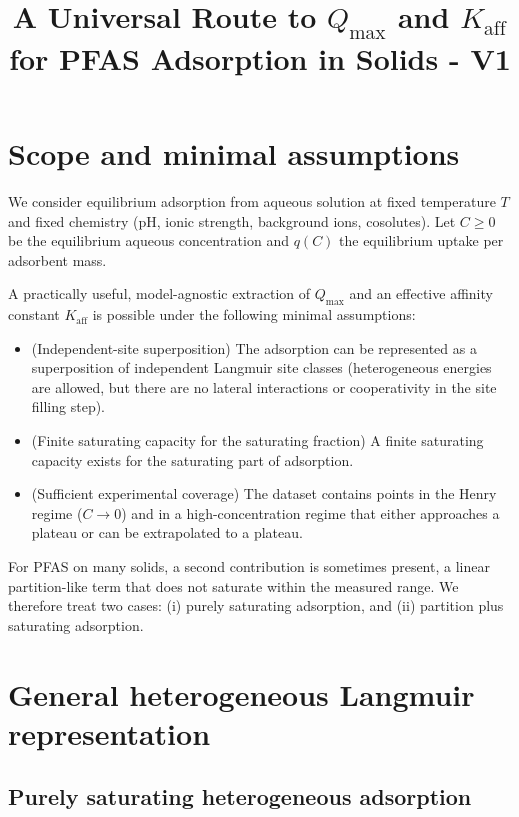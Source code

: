 \documentclass[12pt]{article}
\begin{document}
	
	\title{A Universal Route to $Q_{\max}$ and $K_{\mathrm{aff}}$ for PFAS Adsorption in Solids - V1}
	\author{}
	\date{}
	\maketitle
	
	\section{Scope and minimal assumptions}
	
	We consider equilibrium adsorption from aqueous solution at fixed temperature $T$ and fixed chemistry (pH, ionic strength, background ions, cosolutes). Let $C \ge 0$ be the equilibrium aqueous concentration and $q(C)$ the equilibrium uptake per adsorbent mass.
	
	A practically useful, model-agnostic extraction of $Q_{\max}$ and an effective affinity constant $K_{\mathrm{aff}}$ is possible under the following minimal assumptions:
	
	\begin{itemize}
		\item[A1.] (Independent-site superposition) The adsorption can be represented as a superposition of independent Langmuir site classes (heterogeneous energies are allowed, but there are no lateral interactions or cooperativity in the site filling step).
		\item[A2.] (Finite saturating capacity for the saturating fraction) A finite saturating capacity exists for the saturating part of adsorption.
		\item[A3.] (Sufficient experimental coverage) The dataset contains points in the Henry regime ($C \to 0$) and in a high-concentration regime that either approaches a plateau or can be extrapolated to a plateau.
	\end{itemize}
	
	For PFAS on many solids, a second contribution is sometimes present, a linear partition-like term that does not saturate within the measured range. We therefore treat two cases:
	(i) purely saturating adsorption, and (ii) partition plus saturating adsorption.
	
	\section{General heterogeneous Langmuir representation}
	
	\subsection{Purely saturating heterogeneous adsorption}
	
\end{document}
